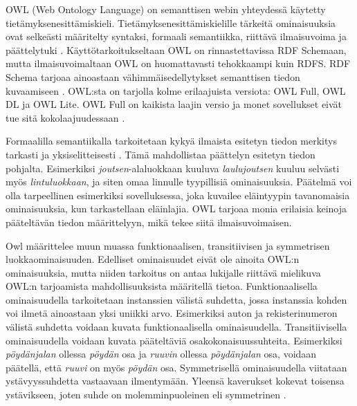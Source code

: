 \documentclass[finnish, 12pt, a4paper, elec, utf8, pdfa, online]{aaltothesis}
\begin{document}
{OWL (Web Ontology Language) on semanttisen webin yhteydessä käytetty tietämyksenesittämiskieli. Tietämyksenesittämiskielille tärkeitä ominaisuuksia ovat selkeästi määritelty syntaksi, formaali semantiikka, riittävä ilmaisuvoima ja päättelytuki \cite{Antoniou}. Käyttötarkoitukseltaan OWL on rinnastettavissa RDF Schemaan, mutta ilmaisuvoimaltaan OWL on huomattavasti tehokkaampi kuin RDFS. RDF Schema tarjoaa ainoastaan vähimmäisedellytykset semanttisen tiedon kuvaamiseen \cite{revisited}. OWL:sta on tarjolla kolme erilaajuista versiota: OWL Full, OWL DL ja OWL Lite. OWL Full on kaikista laajin versio ja monet sovellukset eivät tue sitä kokolaajuudessaan \cite{OWL_specification}.

Formaalilla semantiikalla tarkoitetaan kykyä ilmaista esitetyn tiedon merkitys tarkasti ja yksiselitteisesti \cite{Antoniou}. Tämä mahdollistaa päättelyn esitetyn tiedon pohjalta. Esimerkiksi \textit{joutsen}-alaluokkaan kuuluva \textit{laulujoutsen} kuuluu selvästi myös \textit{lintuluokkaan}, ja siten omaa linnulle tyypillisiä ominaisuuksia. Päätelmä voi olla tarpeellinen esimerkiksi sovelluksessa, joka kuvailee eläintyypin tavanomaisia ominaisuuksia, kun tarkastellaan eläinlajia. OWL tarjoaa monia erilaisia keinoja pääteltävän tiedon määrittelyyn, mikä tekee siitä ilmaisuvoimaisen.

Owl määrittelee muun muassa funktionaalisen, transitiivisen ja symmetrisen luokkaominaisuuden. Edelliset ominaisuudet eivät ole ainoita OWL:n ominaisuuksia, mutta niiden tarkoitus on antaa lukijalle riittävä mielikuva OWL:n tarjoamista mahdollisuuksista määritellä tietoa. Funktionaalisella ominaisuudella tarkoitetaan instanssien välistä suhdetta, jossa instanssia kohden voi ilmetä ainoastaan yksi uniikki arvo. Esimerkiksi auton ja rekisterinumeron välistä suhdetta voidaan kuvata funktionaalisella ominaisuudella. Transitiivisella ominaisuudella voidaan kuvata pääteltäviä osakokonaisuussuhteita. Esimerkiksi \textit{pöydänjalan} ollessa \textit{pöydän} osa ja \textit{ruuvin} ollessa \textit{pöydänjalan} osa, voidaan päätellä, että \textit{ruuvi} on myös \textit{pöydän} osa. Symmetrisellä ominaisuudella viitataan ystävyyssuhdetta vastaavaan ilmentymään. Yleensä kaverukset kokevat toisensa ystävikseen, joten suhde on molemminpuoleinen eli symmetrinen \cite{OWL_specification}.



}
\end{document}
